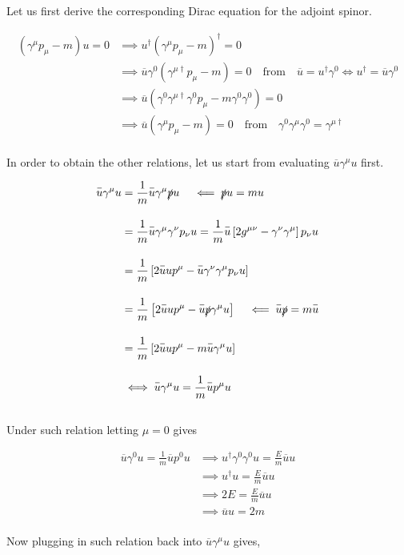 \begin{solution}
Let us first derive the corresponding Dirac equation for the adjoint spinor. 

\begin{align*}
    \left( \gamma^\mu p_\mu - m  \right) u = 0 &\implies  u^\dagger \left( \gamma^\mu p_\mu - m   \right)^\dagger = 0 \\[0.15in]
    &\implies \overbar{u} \gamma^0 \left( \gamma^{\mu\dagger} p_\mu - m   \right)  = 0  \quad \text{from} \quad \overbar{u} = u^\dagger \gamma^0 \iff u^\dagger = \overbar{u}\gamma^0 \\[0.15in]
    &\implies \overbar{u} \left( \gamma^0 \gamma^{\mu\dagger} \gamma^0 p_\mu - m \gamma^0 \gamma^0 \right) = 0 \\[0.15in]
    &\implies \overbar{u} \left(   \gamma^\mu p_\mu - m \right) = 0  \quad \text{from} \quad \gamma^0\gamma^\mu\gamma^0 = \gamma^{\mu\dagger} 
\end{align*}\\
In order to obtain the other relations, let us start from evaluating $\overbar{u}\gamma^\mu u$ first.

\begin{align*}
    \overbar{u}\gamma^\mu u &= \frac{1}{m} \overbar{u} \gamma^\mu \slashed{p} u \quad \impliedby \slashed{p}u = mu  \\[0.15in]
                            &= \frac{1}{m} \overbar{u} \gamma^\mu \gamma^\nu p_\nu u = \frac{1}{m} \overbar{u} \left[ 2g^{\mu\nu}- \gamma^\nu \gamma^\mu \right] p_\nu u \\[0.15in]
                            &= \frac{1}{m} \left[ 2\overbar{u}u p^\mu - \overbar{u} \gamma^\nu \gamma^\mu  p_\nu u \right]  \\[0.15in]
                            &= \frac{1}{m} \left[ 2\overbar{u}u p^\mu - \overbar{u} \slashed{p} \gamma^\mu u \right] \quad \impliedby \overbar{u}\slashed{p} = m \overbar{u} \\[0.15in]
                            &= \frac{1}{m} \left[ 2\overbar{u}u p^\mu - m \overbar{u} \gamma^\mu u \right]   \\[0.15in]
                            &\iff \overbar{u}\gamma^\mu u = \frac{1}{m}\overbar{u}p^\mu u
\end{align*}\\
Under such relation letting $\mu=0$ gives 

\begin{align*}
    \overbar{u}\gamma^0 u = \frac{1}{m}\overbar{u}p^0 u &\implies u^\dagger \gamma^0 \gamma^0 u = \frac{E}{m} \overbar{u} u \\[0.15in]
                                                        &\implies u^\dagger u  =  \frac{E}{m} \overbar{u} u \\[0.15in]
                                                        &\implies 2E =  \frac{E}{m} \overbar{u} u \\[0.15in]
                                                        &\implies \overbar{u} u = 2m 
\end{align*}\\
Now plugging in such relation back into $\overbar{u}\gamma^\mu u $ gives,


\end{solution}
